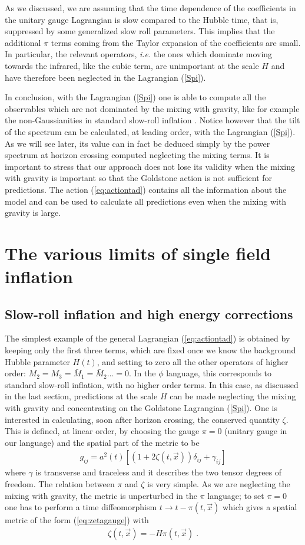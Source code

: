 \documentclass[12pt,letterpaper]{article}
\def\be{\begin{eqnarray}}
\def\ee{\end{eqnarray}}
\begin{document}
{As we discussed, we are assuming that the time dependence of the coefficients in the unitary gauge Lagrangian is slow compared to the Hubble time, that is, suppressed by some generalized slow roll parameters. This implies that  the additional $\pi$ terms coming from the Taylor expansion of the coefficients are small. In particular, the relevant operators, {\it i.e.} the ones which dominate moving towards the infrared, like the cubic term, are unimportant at the scale $H$ and have therefore been neglected in the Lagrangian (\ref{Spi}).

In conclusion, with the Lagrangian (\ref{Spi}) one is able to compute
all the observables which are not dominated by the mixing with
gravity, like for example the non-Gaussianities in standard slow-roll
inflation \cite{Maldacena:2002vr,Seery:2006vu}. Notice however that the tilt of the spectrum can be calculated, at leading order, with the Lagrangian (\ref{Spi}).  As we will see later, its value can in fact be deduced simply by the power spectrum at horizon crossing computed neglecting the mixing terms.
It is important to stress that our approach does not lose its validity
when the mixing with gravity is important so that the Goldstone action
is not sufficient for predictions. The action (\ref{eq:actiontad}) contains all the
information about the model and can be used to calculate all
predictions even when the mixing with gravity is large.

\section{The various limits of single field inflation}


\subsection{Slow-roll inflation and high energy corrections}
The simplest example of the general Lagrangian (\ref{eq:actiontad}) is obtained by keeping only the first three terms, which are fixed once we know the background Hubble parameter $H(t)$, and setting to zero all the other operators of higher order: $M_2 = M_3 = \bar M_1 =\bar M_2 \ldots =0$. In the $\phi$ language, this corresponds to standard slow-roll inflation, with no higher order terms.   
In this case, as discussed in the last section, predictions at the scale $H$ can be made neglecting the mixing with gravity and concentrating on the Goldstone Lagrangian (\ref{Spi}). One is interested in calculating, soon after horizon crossing, the conserved quantity $\zeta$. This is defined, at linear order, by choosing the gauge $\pi = 0$ (unitary gauge in our language) and the spatial part of the metric to be 
\be
\label{eq:zetagauge}
g_{ij} = a^2(t) \left[(1+ 2 \zeta(t,\vec x)) \delta_{ij} + \gamma_{ij}\right]
\ee
where $\gamma$ is transverse and traceless and it describes the two tensor degrees of freedom.
The relation between $\pi$ and $\zeta$ is very simple. As we are neglecting the mixing with gravity, the metric is unperturbed in the $\pi$ language; to set $\pi = 0$ one has to perform a time diffeomorphism
$t \to t - \pi(t,\vec x)$ which gives a spatial metric of the form (\ref{eq:zetagauge}) with
\be
\label{eq:pizeta}
\zeta (t,\vec x) = - H \pi(t, \vec x) \;.
\ee

}
\end{document}
